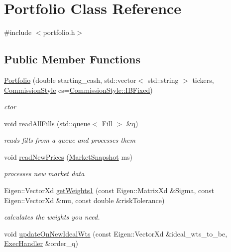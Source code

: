 \hypertarget{classPortfolio}{}\section{Portfolio Class Reference}
\label{classPortfolio}


{\ttfamily \#include $<$portfolio.\+h$>$}

\subsection*{Public Member Functions}
\begin{DoxyCompactItemize}
\item 
\hyperlink{classPortfolio_a24c03991b952db0c6c81210466b9a3ef}{Portfolio} (double starting\+\_\+cash, std\+::vector$<$ std\+::string $>$ tickers, \hyperlink{pnl__calculator_8h_ad733a3c57302a7ac3408d55dc65f2681}{Commission\+Style} cs=\hyperlink{pnl__calculator_8h_ad733a3c57302a7ac3408d55dc65f2681a4c7c9e42a09b0674cdd86bbbd41b42f3}{Commission\+Style\+::\+I\+B\+Fixed})
\begin{DoxyCompactList}\small\item\em ctor \end{DoxyCompactList}\item 
void \hyperlink{classPortfolio_aca045221440cf015b8e51f2f4d939745}{read\+All\+Fills} (std\+::queue$<$ \hyperlink{classFill}{Fill} $>$ \&q)
\begin{DoxyCompactList}\small\item\em reads fills from a queue and processes them \end{DoxyCompactList}\item 
void \hyperlink{classPortfolio_aeff3ceffcd454c7479cfef398798f830}{read\+New\+Prices} (\hyperlink{classMarketSnapshot}{Market\+Snapshot} ms)
\begin{DoxyCompactList}\small\item\em processes new market data \end{DoxyCompactList}\item 
Eigen\+::\+Vector\+Xd \hyperlink{classPortfolio_a7a932e1e5b68e8fc8b91d16287f6de30}{get\+Weights1} (const Eigen\+::\+Matrix\+Xd \&Sigma, const Eigen\+::\+Vector\+Xd \&mu, const double \&risk\+Tolerance)
\begin{DoxyCompactList}\small\item\em calculates the weights you need. \end{DoxyCompactList}\item 
void \hyperlink{classPortfolio_a7824cb431b14cf199b07216f51533d8d}{update\+On\+New\+Ideal\+Wts} (const Eigen\+::\+Vector\+Xd \&ideal\+\_\+wts\+\_\+to\+\_\+be, \hyperlink{classExecHandler}{Exec\+Handler} \&order\+\_\+q)

\end{DoxyCompactItemize}
